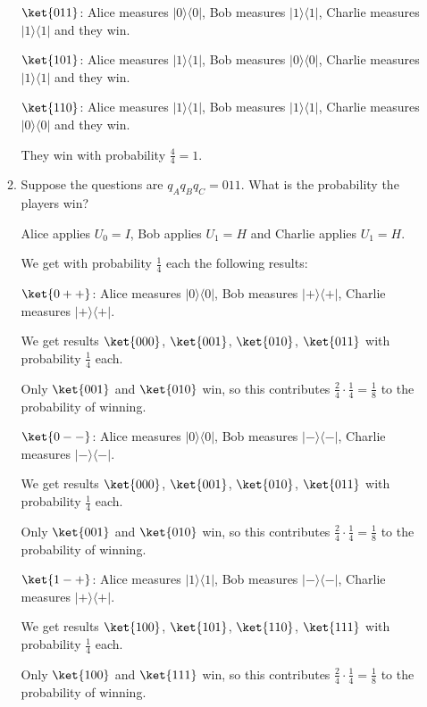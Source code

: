 \documentclass{article}
\newcommand{\ketbra}[2]{|#1\rangle\!\langle #2|}
\begin{document}
\begin{enumerate}
\begin{enumerate}
                $\ket{011}$: Alice measures $\ketbra{0}{0}$, Bob measures $\ketbra{1}{1}$, Charlie measures $\ketbra{1}{1}$ and they win.

                $\ket{101}$: Alice measures $\ketbra{1}{1}$, Bob measures $\ketbra{0}{0}$, Charlie measures $\ketbra{1}{1}$ and they win.

                $\ket{110}$: Alice measures $\ketbra{1}{1}$, Bob measures $\ketbra{1}{1}$, Charlie measures $\ketbra{0}{0}$ and they win.

                They win with probability $\frac{4}{4}=1$.

          \item Suppose the questions are $q_Aq_Bq_C=011$. What is the probability the players win?

                Alice applies $U_0=I$, Bob applies $U_1=H$ and Charlie applies $U_1=H$.

                We get with probability $\frac{1}{4}$ each the following results:

                $\ket{0++}$: Alice measures $\ketbra{0}{0}$, Bob measures $\ketbra{+}{+}$, Charlie measures $\ketbra{+}{+}$.

                We get results $\ket{000}$, $\ket{001}$, $\ket{010}$, $\ket{011}$ with probability $\frac{1}{4}$ each.

                Only $\ket{001}$ and $\ket{010}$ win, so this contributes $\frac{2}{4}\cdot\frac{1}{4}=\frac{1}{8}$ to the probability of winning.

                $\ket{0--}$: Alice measures $\ketbra{0}{0}$, Bob measures $\ketbra{-}{-}$, Charlie measures $\ketbra{-}{-}$.

                We get results $\ket{000}$, $\ket{001}$, $\ket{010}$, $\ket{011}$ with probability $\frac{1}{4}$ each.

                Only $\ket{001}$ and $\ket{010}$ win, so this contributes $\frac{2}{4}\cdot\frac{1}{4}=\frac{1}{8}$ to the probability of winning.

                $\ket{1-+}$: Alice measures $\ketbra{1}{1}$, Bob measures $\ketbra{-}{-}$, Charlie measures $\ketbra{+}{+}$.

                We get results $\ket{100}$, $\ket{101}$, $\ket{110}$, $\ket{111}$ with probability $\frac{1}{4}$ each.

                Only $\ket{100}$ and $\ket{111}$ win, so this contributes $\frac{2}{4}\cdot\frac{1}{4}=\frac{1}{8}$ to the probability of winning.


\end{enumerate}
\end{enumerate}
\end{document}

